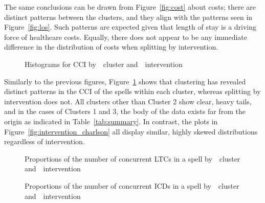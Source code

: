 \documentclass[]{interact}
\newlength{\imgwidth}
\theoremstyle{plain}%
\theoremstyle{definition}
\theoremstyle{remark}
\begin{document}
The same conclusions can be drawn from Figure~\ref{fig:cost} about costs;
there are distinct patterns between the clusters, and they align with the
patterns seen in Figure~\ref{fig:los}. Such patterns are expected given that
length of stay is a driving force of healthcare costs. Equally, there does not
appear to be any immediate difference in the distribution of costs when
splitting by intervention.

\begin{figure}
    \centering

    \caption{%
        Histograms for CCI by~~cluster
        and~~intervention
    }\label{fig:charlson}
\end{figure}

Similarly to the previous figures, Figure~\ref{fig:charlson} shows that
clustering has revealed distinct patterns in the CCI of the spells within each
cluster, whereas splitting by intervention does not. All clusters other than
Cluster 2 show clear, heavy tails, and in the cases of Clusters 1 and 3, the
body of the data exists far from the origin as indicated in
Table~\ref{tab:summary}. In contrast, the plots in
Figure~\ref{fig:intervention_charlson} all display similar, highly skewed
distributions regardless of intervention.

\begin{figure}
    \centering

    \caption{%
        Proportions of the number of concurrent LTCs in a spell
        by~~cluster
        and~~intervention
    }\label{fig:ltcs}
\end{figure}

\begin{figure}
    \centering

    \caption{%
        Proportions of the number of concurrent ICDs in a spell
        by~~cluster
        and~~intervention
    }\label{fig:icds}
\end{figure}
\end{document}
